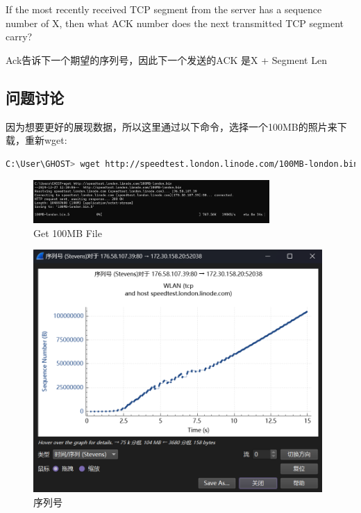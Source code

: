 \documentclass{article}
\begin{document}
	\begin{tcolorbox}[title = {Question-4}, colback = red!25!white, colframe = red!75!black]
		If the most recently received TCP segment from the server has a sequence number of X, then what ACK number does the next transmitted TCP segment carry?
	\end{tcolorbox}
	
	\begin{tcolorbox}[title = {Answer-4}, colback = blue!25!white, colframe = blue!75!black]
		Ack告诉下一个期望的序列号，因此下一个发送的ACK 是X + Segment Len
	\end{tcolorbox}
	
	\subsection{问题讨论}
	
	因为想要更好的展现数据，所以这里通过以下命令，选择一个100MB的照片来下载，重新wget:
	
	\begin{lstlisting}[language=bash]
    C:\User\GHOST> wget http://speedtest.london.linode.com/100MB-london.bin
	\end{lstlisting}
	
	\begin{figure}[H]
		\centering
		\includegraphics[width=9cm]{images/25.Get 100MB File.png}
		\caption{Get 100MB File}
	\end{figure}
	
	\begin{figure}[H]
		\centering
		\includegraphics[width=11cm]{images/26.序列号.png}
		\caption{序列号}
	\end{figure}
	
\end{document}
